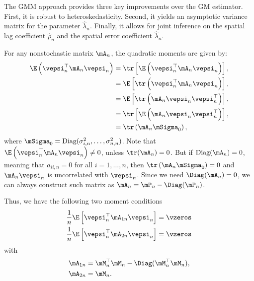 The GMM approach provides three key improvements over the GM estimator. First, it is robust to heteroskedasticity. Second, it yields an asymptotic variance matrix for the parameter $\widehat{\lambda}_n$. Finally, it allows for joint inference on the spatial lag coefficient $\widehat{\rho}_n$ and the spatial error coefficient $\widehat{\lambda}_n$. 

For any nonstochastic matrix $\mA_{n}$, the quadratic moments are given by:
\begin{equation*}
\begin{aligned}
 \E\left(\vepsi_n^\top \mA_n\vepsi_n\right)& = \tr\left[\E\left(\vepsi_n^\top \mA_n\vepsi_n\right)\right], \\
 & = \E\left[\tr\left(\vepsi_n^\top \mA_n\vepsi_n\right)\right], \\
 & = \E\left[\tr\left(\mA_n\vepsi_n\vepsi_n^\top\right)\right], \\
  & = \tr\left[\E\left(\mA_n\vepsi_n\vepsi_n^\top\right)\right], \\
 & = \tr\left(\mA_n\mSigma_0\right), 
\end{aligned}
\end{equation*}
%
where $\mSigma_0 = \textrm{Diag}(\sigma_{i, n}^2, \ldots, \sigma_{n, n}^2)$. Note that $\E\left(\vepsi_n^\top \mA_n\vepsi_n\right)\neq 0$, unless $\tr(\mA_n) = 0$. But if $\textrm{Diag}(\mA_n) = 0$, meaning that $a_{ii, n} = 0$ for all $i = 1, \ldots, n$, then  $\tr\left(\mA_n\mSigma_0\right) = 0$ and $\mA_n\vepsi_n$ is uncorrelated with $\vepsi_n$. Since we need $\Diag(\mA_n) = 0$, we can always construct such matrix as $\mA_n = \mP_{n} - \Diag(\mP_n)$. 

Thus, we have the following two moment conditions
\begin{equation}\label{eq:moment_conditions_reduced}
	\begin{aligned}
\frac{1}{n}\E\left[\vepsi_n^\top\mA_{1n}\vepsi_n\right] & =  \vzeros \\
\frac{1}{n}\E\left[\vepsi_n^\top\mA_{2n}\vepsi_n\right] & =  \vzeros
	\end{aligned}
\end{equation}
%
with
\begin{equation*}
  \begin{aligned}
\mA_{1n} &= \mM^\top_n\mM_n - \Diag(\mM^\top_n\mM_n), \\
\mA_{2n} &= \mM_n.
\end{aligned}
\end{equation*}


